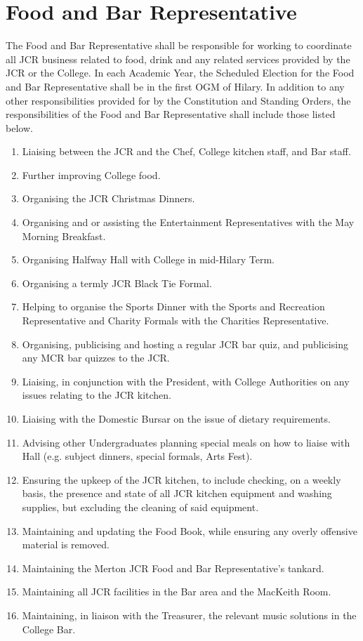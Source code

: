 \section{Food and Bar Representative}
\npara The Food and Bar Representative shall be responsible for working to coordinate all JCR business related to food, drink and any related services provided by the JCR or the College.
\npara In each Academic Year, the Scheduled Election for the Food and Bar Representative shall be in the first OGM of Hilary.
\npara In addition to any other responsibilities provided for by the Constitution and Standing Orders, the responsibilities of the Food and Bar Representative shall include those listed below.
\begin{enumerate}
	\item Liaising between the JCR and the Chef, College kitchen staff, and Bar staff. 
	\item Further improving College food. 
	\item Organising the JCR Christmas Dinners.
	\item Organising and or assisting the Entertainment Representatives with the May Morning Breakfast. 
	\item Organising Halfway Hall with College in mid-Hilary Term.
	\item Organising a termly JCR Black Tie Formal.
	\item Helping to organise the Sports Dinner with the Sports and Recreation Representative and Charity Formals with the Charities Representative.
	\item Organising, publicising and hosting a regular JCR bar quiz, and publicising any MCR bar quizzes to the JCR.
	\item Liaising, in conjunction with the President, with College Authorities on any issues relating to the JCR kitchen. 
	\item Liaising with the Domestic Bursar on the issue of dietary requirements.
	\item Advising other Undergraduates planning special meals on how to liaise with Hall (e.g. subject dinners, special formals, Arts Fest).
	\item Ensuring the upkeep of the JCR kitchen, to include checking, on a weekly basis, the presence and state of all JCR kitchen equipment and washing supplies, but excluding the cleaning of said equipment. 
	\item Maintaining and updating the Food Book, while ensuring any overly offensive material is removed.
	\item Maintaining the Merton JCR Food and Bar Representative's tankard.
	\item Maintaining all JCR facilities in the Bar area and the MacKeith Room.
	\item Maintaining, in liaison with the Treasurer, the relevant music solutions in the College Bar.
\end{enumerate}

